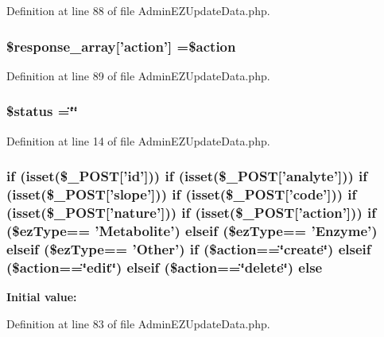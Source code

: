 Definition at line 88 of file Admin\-E\-Z\-Update\-Data.\-php.

\hypertarget{_admin_e_z_update_data_8php_ae768978a0cdc416c0d63d798c85c8784}{
\subsubsection[{\$response\-\_\-array}]{\setlength{\rightskip}{0pt plus 5cm}\$response\-\_\-array\mbox{[}'action'\mbox{]} =\$action}}\label{_admin_e_z_update_data_8php_ae768978a0cdc416c0d63d798c85c8784}


Definition at line 89 of file Admin\-E\-Z\-Update\-Data.\-php.

\hypertarget{_admin_e_z_update_data_8php_a58391ea75f2d29d5d708d7050b641c33}{
\subsubsection[{\$status}]{\setlength{\rightskip}{0pt plus 5cm}\$status =\char`\"{}\char`\"{}}}\label{_admin_e_z_update_data_8php_a58391ea75f2d29d5d708d7050b641c33}


Definition at line 14 of file Admin\-E\-Z\-Update\-Data.\-php.

\hypertarget{_admin_e_z_update_data_8php_ab64b785fa9f787cb880a97455db04dea}{
\subsubsection[{else}]{\setlength{\rightskip}{0pt plus 5cm}if (isset(\$\-\_\-\-P\-O\-S\-T\mbox{[}'id'\mbox{]})) if (isset(\$\-\_\-\-P\-O\-S\-T\mbox{[}'analyte'\mbox{]})) if (isset(\$\-\_\-\-P\-O\-S\-T\mbox{[}'slope'\mbox{]})) if (isset(\$\-\_\-\-P\-O\-S\-T\mbox{[}'code'\mbox{]})) if (isset(\$\-\_\-\-P\-O\-S\-T\mbox{[}'nature'\mbox{]})) if (isset(\$\-\_\-\-P\-O\-S\-T\mbox{[}'action'\mbox{]})) if (\$ez\-Type== 'Metabolite') elseif (\$ez\-Type== 'Enzyme') elseif (\$ez\-Type== 'Other') if (\$action==\char`\"{}create\char`\"{}) elseif (\$action==\char`\"{}edit\char`\"{}) elseif (\$action==\char`\"{}delete\char`\"{}) else}}\label{_admin_e_z_update_data_8php_ab64b785fa9f787cb880a97455db04dea}
{\bfseries Initial value\-:}


Definition at line 83 of file Admin\-E\-Z\-Update\-Data.\-php.

